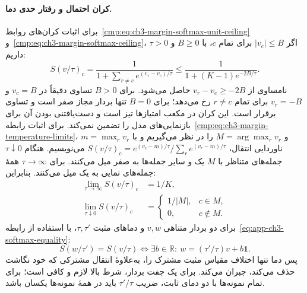 \paragraph{کران احتمال و رفتار حدی دما.}
برای اثبات کران‌های روابط~\eqref{cmp:eq:ch3-margin-softmax-unit-ceiling} و~\eqref{cmp:eq:ch3-margin-softmax-ceiling}، اگر $|v_c|\le B$ برای تمام $c$، با $B\ge0$ و
$\tau>0$ داریم:
\begin{equation}\label{eq:app-ch3-margin-softmax-box-bound}
S(v/\tau)_c
=\frac{1}{1+\sum_{r\ne c}e^{(v_r-v_c)/\tau}}
\le\frac{1}{1+(K-1)e^{-2B/\tau}}.
\end{equation}
نامساوی از $v_r-v_c\ge-2B$ حاصل می‌شود.
برای $B>0$ تساوی دقیقاً در $v_c=B$ و
$v_r=-B$ برای تمام $r\ne c$ رخ می‌دهد؛ برای $B=0$
تنها بردار مجاز صفر است و تساوی برقرار است.
این کران در مکعب امتیازها تیز است و دست‌یافتنی
بودن آن برای بازنمایی‌های مدل را تضمین نمی‌کند.
برای اثبات رابطه~\eqref{cmp:eq:ch3-margin-temperature-limits}، $m=\max_r v_r$ و
$M=\arg\max_r v_r$ را در نظر می‌گیریم و با ناوردایی
انتقال، $S(v/\tau)_c=e^{(v_c-m)/\tau}/\sum_r
e^{(v_r-m)/\tau}$ می‌نویسیم. هنگام $\tau\downarrow0$
جمله‌های متناظر با $M$ یک و سایر جمله‌ها به صفر
میل می‌کنند. برای $\tau\to\infty$ همهٔ جمله‌های
نمایی به یک میل می‌کنند. بنابراین:
\begin{equation}\label{eq:app-ch3-softmax-temperature-limits}
\begin{aligned}
\lim_{\tau\to\infty}S(v/\tau)_c&=1/K,\\
\lim_{\tau\downarrow0}S(v/\tau)_c
&=\begin{cases}1/|M|,&c\in M,\\0,&c\notin M.\end{cases}
\end{aligned}
\end{equation}
برای دو بردار متناهی $v,w$ و دماهای مثبت $\tau,\tau'$،
با استفاده از رابطه~\eqref{eq:app-ch3-softmax-equality}:
\begin{equation}\label{eq:app-ch3-softmax-affine-temperature}
S(w/\tau')=S(v/\tau)
\iff \exists b\in\mathbb R:\ w=(\tau'/\tau)v+b\mathbf1.
\end{equation}
پس دما تنها اختلاف مقیاس مثبت مشترک را، به‌علاوهٔ
انتقال مشترکی که خود نگاشت حذف می‌کند، جبران می‌کند.
برای یک جفت بردار، شرط بالا لازم و کافی است؛ برای
تمام نمونه‌ها با دو دمای ثابت، ضریب $\tau'/\tau$
باید در همهٔ نمونه‌ها یکسان باشد.

